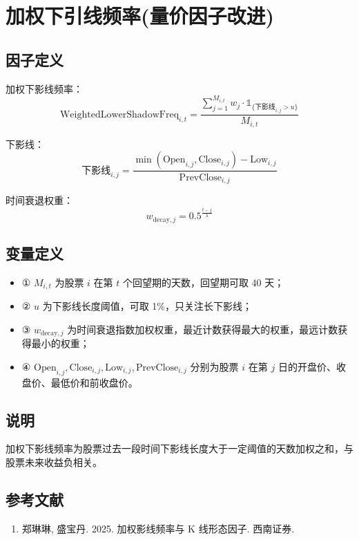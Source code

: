 \documentclass{article}
\begin{document}
\section{加权下引线频率(量价因子改进)}

\subsection{因子定义}

加权下影线频率：
\begin{equation}
    \mathrm{WeightedLowerShadowFreq}_{i,t} = \frac{\sum_{j=1}^{M_{i,t}} w_j \cdot \mathbb{1}_{\{ \text{下影线}_{i,j} > u \}}}{M_{i,t}}
\end{equation}

下影线：
\begin{equation}
    \text{下影线}_{i,j} = \frac{\min(\mathrm{Open}_{i,j}, \mathrm{Close}_{i,j}) - \mathrm{Low}_{i,j}}{\mathrm{PrevClose}_{i,j}}
\end{equation}

时间衰退权重：
\begin{equation}
    w_{\mathrm{decay},j} = 0.5^{\frac{t-j}{\lambda}}
\end{equation}

\subsection{变量定义}
\begin{itemize}
    \item ① \( M_{i,t} \) 为股票 \( i \) 在第 \( t \) 个回望期的天数，回望期可取 40 天；
    \item ② \( u \) 为下影线长度阈值，可取 1\%，只关注长下影线；
    \item ③ \( w_{\mathrm{decay},j} \) 为时间衰退指数加权权重，最近计数获得最大的权重，最远计数获得最小的权重；
    \item ④ \( \mathrm{Open}_{i,j}, \mathrm{Close}_{i,j}, \mathrm{Low}_{i,j}, \mathrm{PrevClose}_{i,j} \) 分别为股票 \( i \) 在第 \( j \) 日的开盘价、收盘价、最低价和前收盘价。
\end{itemize}

\subsection{说明}
加权下影线频率为股票过去一段时间下影线长度大于一定阈值的天数加权之和，与股票未来收益负相关。

\subsection{参考文献}
\begin{enumerate}
    \item 郑琳琳, 盛宝丹. 2025. 加权影线频率与 K 线形态因子. 西南证券.
\end{enumerate}
\end{document}

